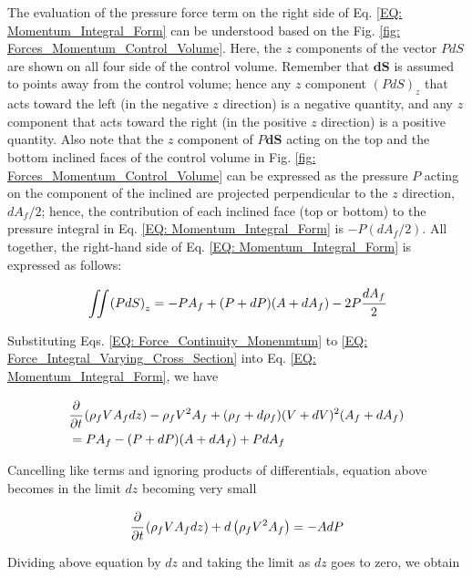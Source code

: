 \documentclass[../Parameter_fitting.tex]{subfiles}
\begin{document}
	The evaluation of the pressure force term on the right side of Eq. \ref{EQ: Momentum_Integral_Form} can be understood based on the Fig. \ref{fig: Forces_Momentum_Control_Volume}. Here, the $z$ components of the vector $PdS$ are shown on all four side of the control volume. Remember that $\textbf{dS}$ is assumed to points away from the control volume; hence  any $z$ component $\left( PdS \right)_z$ that acts toward the left (in the negative $z$ direction) is a negative quantity, and any $z$ component that acts toward the right (in the positive $z$ direction) is a positive quantity. Also note that the $z$ component of $P\textbf{dS}$ acting on the top and the bottom inclined faces of the control volume in Fig. \ref{fig: Forces_Momentum_Control_Volume} can be expressed as the pressure $P$ acting on the component of the inclined are projected perpendicular to the $z$ direction, $dA_f/2$; hence, the contribution of each inclined face (top or bottom) to the pressure integral in Eq. \ref{EQ: Momentum_Integral_Form} is $-P(dA_f/2)$. All together, the right-hand side of Eq. \ref{EQ: Momentum_Integral_Form} is expressed as follows:
	
	{\footnotesize
		\begin{equation}
			\iint \left( PdS \right)_z = -PA_f + (P+dP)(A+dA_f)-2P\cfrac{dA_f}{2}
			\label{EQ: Force_Integral_Varying_Cross_Section}
		\end{equation}
	}
	
	Substituting Eqs. \ref{EQ: Force_Continuity_Monenmtum} to \ref{EQ: Force_Integral_Varying_Cross_Section} into Eq. \ref{EQ: Momentum_Integral_Form}, we have
	
	{\footnotesize
		\begin{align}
			& \cfrac{\partial}{\partial t} \left( \rho_f V A_f dz \right) - \rho_f V^2 A_f + (\rho_f + d\rho_f)(V+dV)^2(A_f+dA_f)  \nonumber \\
			&= PA_f - (P+dP)(A+dA_f)+PdA_f
		\end{align}
	}
	
	Cancelling like terms and ignoring products of differentials, equation above becomes in the limit $dz$ becoming  very small
	
	{\footnotesize
		\begin{equation}
			\cfrac{\partial}{\partial t} \left( \rho_f V A_f dz \right) + d\left( \rho_f V^2 A_f \right) = -A dP
		\end{equation}
	}

	Dividing above equation by $dz$ and taking the limit as $dz$ goes to zero, we obtain
	
\end{document}
